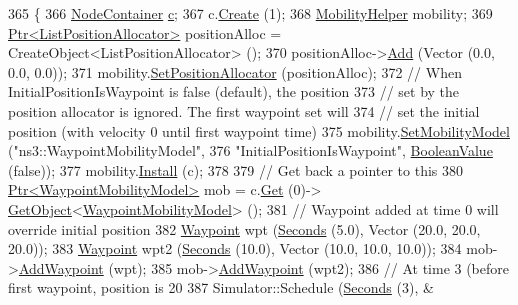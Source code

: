 \begin{DoxyCode}
365 \{
366   \hyperlink{classns3_1_1NodeContainer}{NodeContainer} \hyperlink{lte_2model_2fading-traces_2fading__trace__generator_8m_ae0323a9039add2978bf5b49550572c7c}{c};
367   c.\hyperlink{classns3_1_1NodeContainer_a787f059e2813e8b951cc6914d11dfe69}{Create} (1);
368   \hyperlink{classns3_1_1MobilityHelper}{MobilityHelper} mobility;
369   \hyperlink{classns3_1_1Ptr}{Ptr<ListPositionAllocator>} positionAlloc = CreateObject<ListPositionAllocator> 
      ();
370   positionAlloc->\hyperlink{classns3_1_1ListPositionAllocator_a460e82f015ac012a73ba0ea0cccb3486}{Add} (Vector (0.0, 0.0, 0.0));
371   mobility.\hyperlink{classns3_1_1MobilityHelper_ac59d5295076be3cc11021566713a28c5}{SetPositionAllocator} (positionAlloc);
372   \textcolor{comment}{// When InitialPositionIsWaypoint is false (default), the position}
373   \textcolor{comment}{// set by the position allocator is ignored.  The first waypoint set will}
374   \textcolor{comment}{// set the initial position (with velocity 0 until first waypoint time)}
375   mobility.\hyperlink{classns3_1_1MobilityHelper_a030275011b6f40682e70534d30280aba}{SetMobilityModel} (\textcolor{stringliteral}{"ns3::WaypointMobilityModel"},
376                              \textcolor{stringliteral}{"InitialPositionIsWaypoint"}, \hyperlink{classns3_1_1BooleanValue}{BooleanValue} (\textcolor{keyword}{false}));
377   mobility.\hyperlink{classns3_1_1MobilityHelper_a07737960ee95c0777109cf2994dd97ae}{Install} (c);
378 
379   \textcolor{comment}{// Get back a pointer to this}
380   \hyperlink{classns3_1_1Ptr}{Ptr<WaypointMobilityModel>} mob = c.\hyperlink{classns3_1_1NodeContainer_a9ed96e2ecc22e0f5a3d4842eb9bf90bf}{Get} (0)->
      \hyperlink{classns3_1_1Object_a13e18c00017096c8381eb651d5bd0783}{GetObject}<\hyperlink{classns3_1_1WaypointMobilityModel}{WaypointMobilityModel}> ();
381   \textcolor{comment}{// Waypoint added at time 0 will override initial position}
382   \hyperlink{classns3_1_1Waypoint}{Waypoint} wpt (\hyperlink{group__timecivil_ga33c34b816f8ff6628e33d5c8e9713b9e}{Seconds} (5.0), Vector (20.0, 20.0, 20.0));
383   \hyperlink{classns3_1_1Waypoint}{Waypoint} wpt2 (\hyperlink{group__timecivil_ga33c34b816f8ff6628e33d5c8e9713b9e}{Seconds} (10.0), Vector (10.0, 10.0, 10.0));
384   mob->\hyperlink{classns3_1_1WaypointMobilityModel_ae16c90c21c463289bbea2b3499a94643}{AddWaypoint} (wpt);
385   mob->\hyperlink{classns3_1_1WaypointMobilityModel_ae16c90c21c463289bbea2b3499a94643}{AddWaypoint} (wpt2);
386   \textcolor{comment}{// At time 3 (before first waypoint, position is 20}
387   Simulator::Schedule (\hyperlink{group__timecivil_ga33c34b816f8ff6628e33d5c8e9713b9e}{Seconds} (3), &

\end{DoxyCode}
